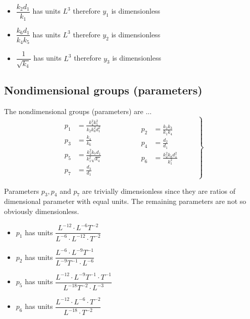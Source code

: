 \documentclass[10pt,letterpaper]{article}
\begin{document}
\begin{itemize}
  \item $\dfrac{k_2 d_1}{k_1}$ has units $L^3$ therefore $y_1$ is dimensionless
  \item $\dfrac{k_6 d_1}{k_4 k_5}$ has units $L^3$ therefore $y_2$ is dimensionless
  \item $\dfrac{1}{\sqrt{k_4}}$ has units $L^3$ therefore $y_3$ is dimensionless
\end{itemize}


\subsection{Nondimensional groups (parameters)}

The nondimensional groups (parameters) are ...
\begin{equation}\label{eq:parameters}
\left.
\begin{gathered}\begin{aligned}
p_1 &= \frac{k_4^2 k_5^2}{k_2 k_6^2 d_1^2}  \\
p_3 &= \frac{k_4}{k_6} \\
p_5 &= \frac{k_2^2 k_7 d_1}{k_1^2 \sqrt{k_4}} \\
p_7 &= \frac{d_3}{d_1}
\end{aligned}\end{gathered}
\qquad \qquad
\begin{gathered}\begin{aligned}
p_2 &= \frac{k_2 k_3}{k_1 k_4} \\
p_4 &= \frac{d_2}{d_1} \\
p_6 &= \frac{k_2^2 k_8 d_1^2}{k_1^2} \\
& \\
\end{aligned}\end{gathered}
\qquad \right \}
\end{equation}

Parameters $p_3, p_4$ and $p_7$ are trivially dimensionless  since they are ratios of dimensional parameter with equal units. The remaining parameters are not so obviously dimensionless.
\begin{itemize}
  \item $p_1$ has units $\dfrac{L^{-12}\cdot L^{-6}T^{-2}}               {L^{-6} \cdot L^{-12} \cdot T^{-2}}$
  \item $p_2$ has units $\dfrac{L^{-6} \cdot L^{-9}T^{-1}}               {L^{-9} T^{-1} \cdot L^{-6}}$
  \item $p_5$ has units $\dfrac{L^{-12}\cdot L^{-9}T^{-1} \cdot T^{-1} } {L^{-18} T^{-2} \cdot L^{-3}}$
  \item $p_6$ has units $\dfrac{L^{-12}\cdot L^{-6} \cdot T^{-2}}        {L^{-18}\cdot T^{-2}}$
\end{itemize}
\end{document}
